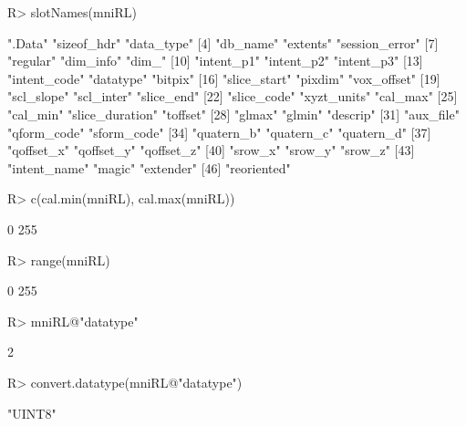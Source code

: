 \documentclass[
]{jss}
\begin{document}
\begin{CodeChunk}

\begin{CodeInput}
R> slotNames(mniRL)
\end{CodeInput}

\begin{CodeOutput}
 [1] ".Data"          "sizeof_hdr"     "data_type"     
 [4] "db_name"        "extents"        "session_error" 
 [7] "regular"        "dim_info"       "dim_"          
[10] "intent_p1"      "intent_p2"      "intent_p3"     
[13] "intent_code"    "datatype"       "bitpix"        
[16] "slice_start"    "pixdim"         "vox_offset"    
[19] "scl_slope"      "scl_inter"      "slice_end"     
[22] "slice_code"     "xyzt_units"     "cal_max"       
[25] "cal_min"        "slice_duration" "toffset"       
[28] "glmax"          "glmin"          "descrip"       
[31] "aux_file"       "qform_code"     "sform_code"    
[34] "quatern_b"      "quatern_c"      "quatern_d"     
[37] "qoffset_x"      "qoffset_y"      "qoffset_z"     
[40] "srow_x"         "srow_y"         "srow_z"        
[43] "intent_name"    "magic"          "extender"      
[46] "reoriented"    
\end{CodeOutput}

\begin{CodeInput}
R> c(cal.min(mniRL), cal.max(mniRL))
\end{CodeInput}

\begin{CodeOutput}
[1]   0 255
\end{CodeOutput}

\begin{CodeInput}
R> range(mniRL)
\end{CodeInput}

\begin{CodeOutput}
[1]   0 255
\end{CodeOutput}

\begin{CodeInput}
R> mniRL@"datatype"
\end{CodeInput}

\begin{CodeOutput}
[1] 2
\end{CodeOutput}

\begin{CodeInput}
R> convert.datatype(mniRL@"datatype")
\end{CodeInput}

\begin{CodeOutput}
[1] "UINT8"
\end{CodeOutput}
\end{CodeChunk}
\end{document}
